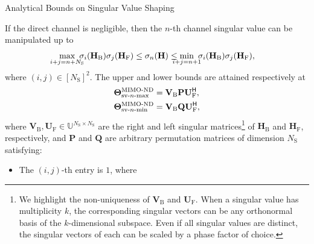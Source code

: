 \begin{section}{Analytical Bounds on Singular Value Shaping}
	\begin{corollary}
		If the direct channel is negligible,
		then the $n$-th channel singular value can be manipulated up to
		\begin{equation}
			\max_{\mathclap{i+j=n+N_\mathrm{S}}} \ \sigma_i(\mathbf{H}_\mathrm{B}) \sigma_j(\mathbf{H}_\mathrm{F}) \le \sigma_n(\mathbf{H}) \le \min_{\mathclap{i+j=n+1}} \ \sigma_i(\mathbf{H}_\mathrm{B}) \sigma_j(\mathbf{H}_\mathrm{F}),
			\label{iq:sv_nth}
		\end{equation}
		where $(i, j) \in [N_\mathrm{S}]^2$.
		The upper and lower bounds are attained respectively at
		\begin{subequations}
			\label{eq:sv_nth}
			\begin{align}
				\mathbf{\Theta}_{\textnormal{sv-}n\textnormal{-max}}^\textnormal{MIMO-ND} & = \mathbf{V}_\mathrm{B} \mathbf{P} \mathbf{U}_\mathrm{F}^\mathsf{H}, \label{eq:sv_nth_max} \\
				\mathbf{\Theta}_{\textnormal{sv-}n\textnormal{-min}}^\textnormal{MIMO-ND} & = \mathbf{V}_\mathrm{B} \mathbf{Q} \mathbf{U}_\mathrm{F}^\mathsf{H}, \label{eq:sv_nth_min}
			\end{align}
		\end{subequations}
		where $\mathbf{V}_\mathrm{B}, \mathbf{U}_\mathrm{F} \in \mathbb{U}^{N_\mathrm{S} \times N_\mathrm{S}}$ are the right and left singular matrices\footnote{We highlight the non-uniqueness of $\mathbf{V}_\mathrm{B}$ and $\mathbf{U}_\mathrm{F}$. When a singular value has multiplicity $k$, the corresponding singular vectors can be any orthonormal basis of the $k$-dimensional subspace. Even if all singular values are distinct, the singular vectors of each can be scaled by a phase factor of choice.} of $\mathbf{H}_\mathrm{B}$ and $\mathbf{H}_\mathrm{F}$, respectively,
		and $\mathbf{P}$ and $\mathbf{Q}$ are arbitrary permutation matrices of dimension $N_\mathrm{S}$ satisfying:
		\begin{itemize}
			\item The $(i, j)$-th entry is $1$, where

\end{itemize}
\end{corollary}
\end{section}
